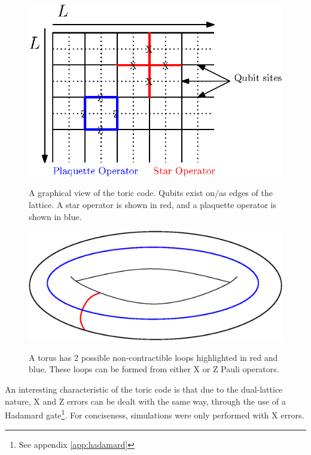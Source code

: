\begin{figure}
	
	\begin{minipage}[b]{0.45\textwidth}
		\centering
		\includegraphics[width = \textwidth]{figs/toricgrid.eps}
		\caption{A graphical view of the toric code. Qubits exist on/as edges of the lattice. A star operator is shown in red, and a plaquette operator is shown in blue.}
		\label{fig:toricgrid}
	\end{minipage}\hfill
	\begin{minipage}[b]{0.45\textwidth}
		\includegraphics[width = \textwidth ]{figs/torus.eps}
		\caption{A torus has 2 possible non-contractible loops highlighted in red and blue. These loops can be formed from either X or Z Pauli operators.}
	\end{minipage}
	\caption{}
	
\end{figure}
An interesting characteristic of the toric code is that due to the dual-lattice nature, X and Z errors can be dealt with the same way, through the use of a Hadamard gate\footnote{See appendix \ref{app:hadamard}}. For conciseness, simulations were only performed with X errors. 
